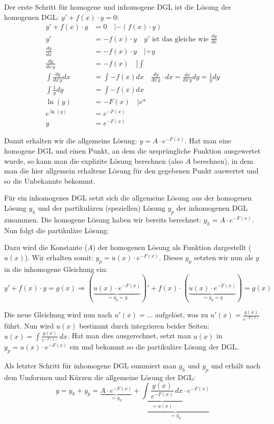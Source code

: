 Der erste Schritt für homogene und inhomogene DGL ist die Lösung der homogenen
DGL: $y' + f(x) \cdot y = 0$:
{\small
\begin{align*}
y' + f(x) \cdot y &= 0 \quad \left | -(f(x) \cdot y) \right.\\
y' &= -f(x) \cdot y \quad \boxed{y' \text{ ist das gleiche wie } \frac{dy}{dx}}\\
\frac{dy}{dx} &= -f(x) \cdot y \quad \left | \div y \right.\\
\frac{dy}{dx\, y} &= -f(x) \quad \left | \int \right.\\
\int \frac{dy}{dx\, y} dx &= \int -f(x) dx \quad \boxed{\frac{dy}{dx\, y} \cdot dx = \frac{dx}{dx\, y} dy = \frac{1}{y} dy}\\
\int \frac{1}{y} dy &= \int -f(x) dx\\
\ln(y) &= -F(x) \quad \left | e^\alpha \right.\\
e^{\ln(y)} &= e^{-F(x)}\\
y &= e^{-F(x)}
\end{align*}
}

Damit erhalten wir die allgemeine Lösung: $y = A \cdot e^{-F(x)}$. Hat man eine
homogene DGL und einen Punkt, an dem die ursprüngliche Funktion ausgewertet wurde,
so kann man die explizite Lösung berechnen (also $A$ berechnen), in dem man die
hier allgemein erhaltene Lösung für den gegebenen Punkt auswertet und so die
Unbekannte bekommt.

Für ein inhomogenes DGL setzt sich die allgemeine Lösung aus der homogenen Lösung
$y_h$ und der partikulären (speziellen) Lösung $y_p$ der inhomogenen DGL zusammen.
Die homogene Lösung haben wir bereits berechnet: $y_h = A \cdot e^{-F(x)}$. Nun
folgt die partikuläre Lösung:

Dazu wird die Konstante ($A$) der homogenen Lösung als Funktion dargestellt ($u(x)$).
Wir erhalten somit: $y_p = u(x) \cdot e^{-F(x)}$.
Dieses $y_p$ setzten wir nun als $y$ in die inhomogene Gleichung ein:
{\small
\[
y' + f(x) \cdot y = g(x) \Rightarrow (\underbrace{u(x) \cdot e^{-F(x)}}_{= y_p = y})'
+ f(x) \cdot (\underbrace{u(x) \cdot e^{-F(x)}}_{= y_p = y}) = g(x)
\]
}

Die neue Gleichung wird nun nach $u'(x) = \ldots$ aufgelöst, was zu
$u'(x) = \frac{g(x)}{e^{-F(x)}}$ führt. Nun wird $u(x)$ bestimmt durch integrieren
beider Seiten: $u(x) = \int \frac{g(x)}{e^{-F(x)}}\,dx$. Hat man dies ausgerechnet,
setzt man $u(x)$ in $y_p = u(x) \cdot e^{-F(x)}$ ein und bekommt so die partikuläre
Lösung der DGL.

Als letzter Schritt für inhomogene DGL summiert man $y_h$ und $y_p$ und erhält nach
dem Umformen und Kürzen die allgemeine Lösung der DGL:
{\small
\[
y = y_h + y_p = 
\underbrace{A \cdot e^{-F(x)}}_{= y_h} +
\underbrace{\underbrace{\int \frac{g(x)}{e^{-F(x)}}\,dx}_{= u(x)} \cdot e^{-F(x)}}_{= y_p}
\]
}

